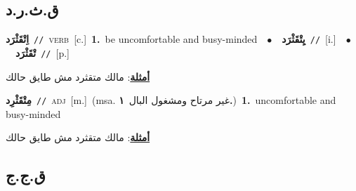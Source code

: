 \documentclass[10pt,a4paper,twoside]{article} %
\begin{document}
\begin{multicols}{2}
{{{{{{{{{{{{{{{{\vspace{-3mm}
\subsection*{\color{blue}\foreignlanguage{arabic}{ق.ث.ر.د}\color{blue}{}} 

{\setlength\topsep{0pt}\textbf{\foreignlanguage{arabic}{اِتْقَثْرَد}}\ {\color{gray}\texttt{//}\color{black}}\ \textsc{verb}\ [c.]\ \textbf{1.}~be uncomfortable and busy-minded\ \ $\bullet$\ \ \setlength\topsep{0pt}\textbf{\foreignlanguage{arabic}{يِتْقَثْرَد}}\ {\color{gray}\texttt{//}\color{black}}\ [i.]\ \ $\bullet$\ \ \setlength\topsep{0pt}\textbf{\foreignlanguage{arabic}{تْقَثْرَد}}\ {\color{gray}\texttt{//}\color{black}}\ [p.]\  \begin{flushright}\color{gray}\foreignlanguage{arabic}{\textbf{\underline{\foreignlanguage{arabic}{أمثلة}}}: مالك متقثرد مش طايق حالك}\end{flushright}\color{black}} \vspace{2mm}

{\setlength\topsep{0pt}\textbf{\foreignlanguage{arabic}{مِتْقَثْرِد}}\ {\color{gray}\texttt{//}\color{black}}\ \textsc{adj}\ [m.]\ \color{gray}(msa. \foreignlanguage{arabic}{غير مرتاح ومشغول البال}~\foreignlanguage{arabic}{\textbf{١.}})\color{black}\ \textbf{1.}~uncomfortable and busy-minded\  \begin{flushright}\color{gray}\foreignlanguage{arabic}{\textbf{\underline{\foreignlanguage{arabic}{أمثلة}}}: مالك متقثرد مش طايق حالك}\end{flushright}\color{black}} \vspace{2mm}

\vspace{-3mm}
\subsection*{\color{blue}\foreignlanguage{arabic}{ق.ج.ج}\color{blue}{}} 

}}}}}}}}}}}}}}}}
\end{multicols}
\end{document}
